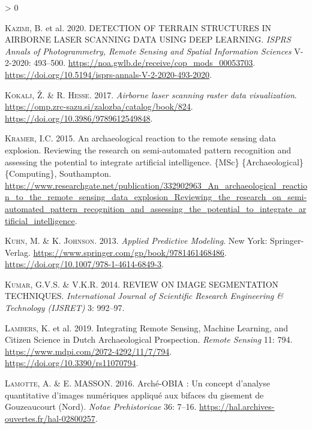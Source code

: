 \documentclass[
  12pt,
]{article}
\newlength{\cslhangindent}
\newenvironment{CSLReferences}[2] %
 {%
  \setlength{\parindent}{0pt}
  \ifodd #1 \everypar{\setlength{\hangindent}{\cslhangindent}}\ignorespaces\fi
  \ifnum #2 > 0
  \setlength{\parskip}{#2\baselineskip}
  \fi
 }%
 {}
\begin{document}
\begin{CSLReferences}{1}{0}
\leavevmode\hypertarget{ref-kazimiDETECTIONTERRAINSTRUCTURES2020a}{}%
\textsc{Kazimi}, B. et al. 2020. {DETECTION} {OF} {TERRAIN} {STRUCTURES} {IN} {AIRBORNE} {LASER} {SCANNING} {DATA} {USING} {DEEP} {LEARNING}. \emph{ISPRS Annals of Photogrammetry, Remote Sensing and Spatial Information Sciences} V-2-2020: 493--500. \url{https://noa.gwlb.de/receive/cop_mods_00053703}. \url{https://doi.org/10.5194/isprs-annals-V-2-2020-493-2020}.

\leavevmode\hypertarget{ref-kokaljAirborneLaserScanning2017a}{}%
\textsc{Kokalj}, Ž. \& R. \textsc{Hesse}. 2017. \emph{Airborne laser scanning raster data visualization}. \url{https://omp.zrc-sazu.si/zalozba/catalog/book/824}. \url{https://doi.org/10.3986/9789612549848}.

\leavevmode\hypertarget{ref-kramerArchaeologicalReactionRemote2015}{}%
\textsc{Kramer}, I.C. 2015. An archaeological reaction to the remote sensing data explosion. {Reviewing} the research on semi-automated pattern recognition and assessing the potential to integrate artificial intelligence. \{MSc\} \{Archaeological\} \{Computing\}, Southampton. \url{https://www.researchgate.net/publication/332902963_An_archaeological_reaction_to_the_remote_sensing_data_explosion_Reviewing_the_research_on_semi-automated_pattern_recognition_and_assessing_the_potential_to_integrate_artificial_intelligence}.

\leavevmode\hypertarget{ref-kuhnAppliedPredictiveModeling2013}{}%
\textsc{Kuhn}, M. \& K. \textsc{Johnson}. 2013. \emph{Applied {Predictive} {Modeling}}. New York: Springer-Verlag. \url{https://www.springer.com/gp/book/9781461468486}. \url{https://doi.org/10.1007/978-1-4614-6849-3}.

\leavevmode\hypertarget{ref-kumarREVIEWIMAGESEGMENTATION2014}{}%
\textsc{Kumar}, G.V.S. \& V.K.\textsc{R}. 2014. {REVIEW} {ON} {IMAGE} {SEGMENTATION} {TECHNIQUES}. \emph{International Journal of Scientific Research Engineering \& Technology (IJSRET)} 3: 992--97.

\leavevmode\hypertarget{ref-lambersIntegratingRemoteSensing2019}{}%
\textsc{Lambers}, K. et al. 2019. Integrating {Remote} {Sensing}, {Machine} {Learning}, and {Citizen} {Science} in {Dutch} {Archaeological} {Prospection}. \emph{Remote Sensing} 11: 794. \url{https://www.mdpi.com/2072-4292/11/7/794}. \url{https://doi.org/10.3390/rs11070794}.

\leavevmode\hypertarget{ref-lamotteArcheOBIAConceptAnalyse2016a}{}%
\textsc{Lamotte}, A. \& E. \textsc{MASSON}. 2016. Arché-{OBIA} : Un concept d'analyse quantitative d'images numériques appliqué aux bifaces du gisement de {Gouzeaucourt} ({Nord}). \emph{Notae Prehistoricae} 36: 7--16. \url{https://hal.archives-ouvertes.fr/hal-02800257}.


\end{CSLReferences}
\end{document}
